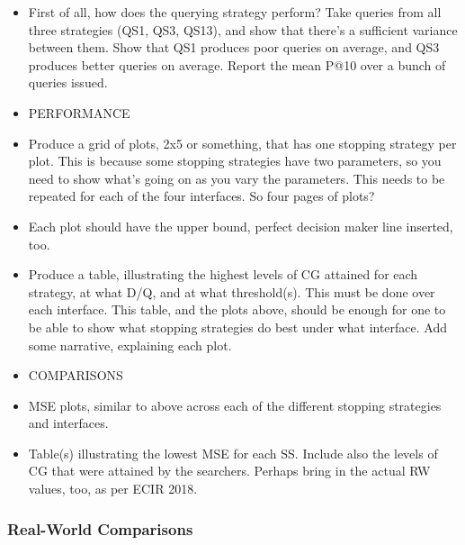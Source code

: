 \begin{itemize}
    
    \item{First of all, how does the querying strategy perform? Take queries from all three strategies (QS1, QS3, QS13), and show that there's a sufficient variance between them. Show that QS1 produces poor queries on average, and QS3 produces better queries on average. Report the mean P@10 over a bunch of queries issued.}
    
    \item{PERFORMANCE}
    
    \item{Produce a grid of plots, 2x5 or something, that has one stopping strategy per plot. This is because some stopping strategies have two parameters, so you need to show what's going on as you vary the parameters. This needs to be repeated for each of the four interfaces. So four pages of plots?}
    
    \item{Each plot should have the upper bound, perfect decision maker line inserted, too.}
    
    \item{Produce a table, illustrating the highest levels of CG attained for each strategy, at what D/Q, and at what threshold(s). This must be done over each interface. This table, and the plots above, should be enough for one to be able to show what stopping strategies do best under what interface. Add some narrative, explaining each plot.}
    
    \item{COMPARISONS}
    
    \item{MSE plots, similar to above across each of the different stopping strategies and interfaces.}
    
    \item{Table(s) illustrating the lowest MSE for each SS. Include also the levels of CG that were attained by the searchers. Perhaps bring in the actual RW values, too, as per ECIR 2018.}
    
\end{itemize}

\subsubsection{Real-World Comparisons}\label{sec:snippets:simulations:results:comparisons}

